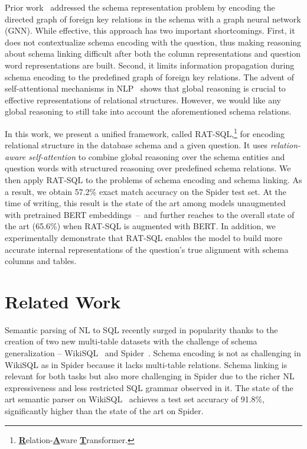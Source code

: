\documentclass[11pt,a4paper,final]{article}
\newcommand\bestresult{57.2\%}
\newcommand\bestresultwithbert{65.6\%}
\begin{document}
Prior work~\citep{gnnsql} addressed the schema representation problem by encoding the directed graph of foreign key
relations in the schema with a graph neural network (GNN).
While effective, this approach has two important shortcomings.
First, it does not contextualize schema encoding with the question, thus making reasoning
about schema linking difficult after both the column representations and question word representations are built.
Second, it limits information propagation during schema encoding to the predefined graph of foreign key relations.
The advent of self-attentional mechanisms in NLP~\citep{vaswaniAttentionAllYou2017} shows that
global reasoning is crucial to effective representations of relational structures.
However, we would like any global reasoning to still take into account the aforementioned schema relations.

In this work, we present a unified framework, called RAT-SQL,\footnote{\underline{\bfseries R}elation-\underline{\bfseries A}ware \underline{\bfseries T}ransformer.}
for encoding relational structure in the database schema and a given question.
It uses \emph{relation-aware self-attention} to combine global reasoning over the schema entities and question words
with structured reasoning over predefined schema relations.
We then apply RAT-SQL to the problems of schema encoding and schema linking.
As a result, we obtain \bestresult{} exact match accuracy on the Spider test set.
At the time of writing, this result is the state of the art among models unaugmented with pretrained BERT
embeddings~--~and further reaches to the overall state of the art (\bestresultwithbert) when RAT-SQL is augmented with
BERT.
In addition, we experimentally demonstrate that RAT-SQL enables the model to build more accurate internal
representations of the question's true alignment with schema columns and tables.



 \section{Related Work}
\label{sec:related-work}

Semantic parsing of NL to SQL recently surged in popularity thanks to the creation of
two new multi-table datasets with the challenge of schema generalization --
WikiSQL~\citep{zhongSeq2SQLGeneratingStructured2017} and Spider~\citep{data-spider}.
Schema encoding is not as challenging in WikiSQL as in Spider because it lacks multi-table relations.
Schema linking is relevant for both tasks but also more challenging in Spider due to the richer NL
expressiveness and less restricted SQL grammar observed in it.
The state of the art semantic parser on WikiSQL~\citep{xsql} achieves a test set accuracy of 91.8\%, significantly
higher than the state of the art on Spider.
\end{document}
